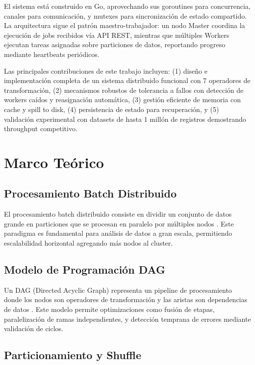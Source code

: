 \documentclass[conference]{IEEEtran}
\begin{document}
El sistema está construido en Go, aprovechando sus goroutines para concurrencia, canales para comunicación, y mutexes para sincronización de estado compartido. La arquitectura sigue el patrón maestro-trabajador: un nodo Master coordina la ejecución de jobs recibidos vía API REST, mientras que múltiples Workers ejecutan tareas asignadas sobre particiones de datos, reportando progreso mediante heartbeats periódicos.

Las principales contribuciones de este trabajo incluyen: (1) diseño e implementación completa de un sistema distribuido funcional con 7 operadores de transformación, (2) mecanismos robustos de tolerancia a fallos con detección de workers caídos y reasignación automática, (3) gestión eficiente de memoria con cache y spill to disk, (4) persistencia de estado para recuperación, y (5) validación experimental con datasets de hasta 1 millón de registros demostrando throughput competitivo.

\section{Marco Teórico}\label{sec:marco}

\subsection{Procesamiento Batch Distribuido}

El procesamiento batch distribuido consiste en dividir un conjunto de datos grande en particiones que se procesan en paralelo por múltiples nodos \cite{dean2004mapreduce}. Este paradigma es fundamental para análisis de datos a gran escala, permitiendo escalabilidad horizontal agregando más nodos al cluster.

\subsection{Modelo de Programación DAG}

Un DAG (Directed Acyclic Graph) representa un pipeline de procesamiento donde los nodos son operadores de transformación y las aristas son dependencias de datos \cite{spark}. Este modelo permite optimizaciones como fusión de etapas, paralelización de ramas independientes, y detección temprana de errores mediante validación de ciclos.

\subsection{Particionamiento y Shuffle}
\end{document}
